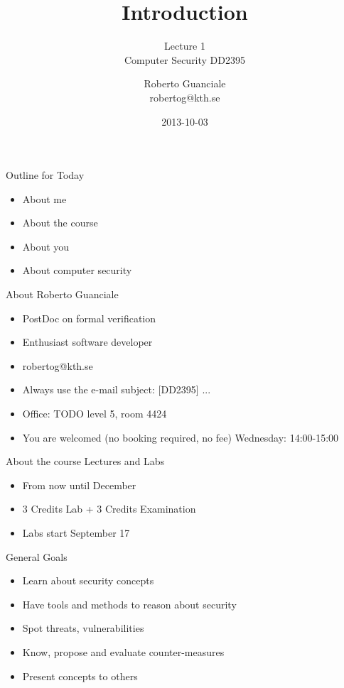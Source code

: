\documentclass{beamer}
\title{Introduction}
\subtitle{Lecture 1 \\ Computer Security DD2395}
\author[R. Guanciale]{
  Roberto Guanciale\\
  robertog@kth.se
}
\date{2013-10-03}
\newcommand{\todo}[1]{\alert{TODO #1}}
\begin{document}
\begin{frame}[plain]
  \titlepage
\end{frame}

\begin{frame}{Outline for Today}
  \begin{itemize}
    \item About me
    \item About the course
    \item About you
    \item About computer security
  \end{itemize}
\end{frame}

\begin{frame}{About Roberto Guanciale}
  \begin{itemize}
    \item PostDoc on formal verification
    \item Enthusiast software developer
    \item robertog@kth.se
    \item \alert{Always} use the e-mail subject: [DD2395] ...
    \item Office: \todo{level 5, room 4424}
    \item You are welcomed (no booking required, no fee) Wednesday:
      14:00-15:00
  \end{itemize}
\end{frame}

\begin{frame}{About the course}
  Lectures and Labs
  \begin{itemize}
    \item From now until December
    \item 3 Credits Lab + 3 Credits Examination
    \item Labs start September 17
  \end{itemize}
\end{frame}

\begin{frame}{General Goals}
  \begin{itemize}
    \item Learn about security concepts
    \item Have tools and methods to reason about security
    \item Spot threats, vulnerabilities
    \item Know, propose and evaluate counter-measures
    \item Present concepts to others 
  \end{itemize}
\end{frame}
\end{document}
